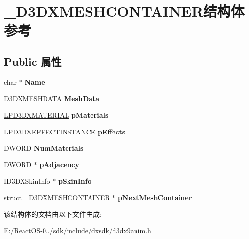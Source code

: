 \hypertarget{struct___d3_d_x_m_e_s_h_c_o_n_t_a_i_n_e_r}{}\section{\+\_\+\+D3\+D\+X\+M\+E\+S\+H\+C\+O\+N\+T\+A\+I\+N\+E\+R结构体 参考}
\label{struct___d3_d_x_m_e_s_h_c_o_n_t_a_i_n_e_r}
\subsection*{Public 属性}
\begin{DoxyCompactItemize}
\item 
\mbox{\label{struct___d3_d_x_m_e_s_h_c_o_n_t_a_i_n_e_r_adaf17b161d78cec5b23e88fd559e7b4f}} 
char $\ast$ {\bfseries Name}
\item 
\mbox{\label{struct___d3_d_x_m_e_s_h_c_o_n_t_a_i_n_e_r_a476873e422f689ecfd5326aa98139ac7}} 
\hyperlink{struct___d3_d_x_m_e_s_h_d_a_t_a}{D3\+D\+X\+M\+E\+S\+H\+D\+A\+TA} {\bfseries Mesh\+Data}
\item 
\mbox{\label{struct___d3_d_x_m_e_s_h_c_o_n_t_a_i_n_e_r_a9a65238dc309558441abc88de624f661}} 
\hyperlink{struct___d3_d_x_m_a_t_e_r_i_a_l}{L\+P\+D3\+D\+X\+M\+A\+T\+E\+R\+I\+AL} {\bfseries p\+Materials}
\item 
\mbox{\label{struct___d3_d_x_m_e_s_h_c_o_n_t_a_i_n_e_r_a033154ae07d5b0475d111dedd26c5afb}} 
\hyperlink{struct___d3_d_x_e_f_f_e_c_t_i_n_s_t_a_n_c_e}{L\+P\+D3\+D\+X\+E\+F\+F\+E\+C\+T\+I\+N\+S\+T\+A\+N\+CE} {\bfseries p\+Effects}
\item 
\mbox{\label{struct___d3_d_x_m_e_s_h_c_o_n_t_a_i_n_e_r_aa9eaaeed481a057cbb3569ab0b389f2b}} 
D\+W\+O\+RD {\bfseries Num\+Materials}
\item 
\mbox{\label{struct___d3_d_x_m_e_s_h_c_o_n_t_a_i_n_e_r_aba5026c5908f7fac0d444a0d171b491f}} 
D\+W\+O\+RD $\ast$ {\bfseries p\+Adjacency}
\item 
\mbox{\label{struct___d3_d_x_m_e_s_h_c_o_n_t_a_i_n_e_r_afd6f76934feccd37269e362e255532bb}} 
I\+D3\+D\+X\+Skin\+Info $\ast$ {\bfseries p\+Skin\+Info}
\item 
\mbox{\label{struct___d3_d_x_m_e_s_h_c_o_n_t_a_i_n_e_r_aa303163ef838ca8738eb0f2ead6ef03c}} 
\hyperlink{interfacestruct}{struct} \hyperlink{struct___d3_d_x_m_e_s_h_c_o_n_t_a_i_n_e_r}{\+\_\+\+D3\+D\+X\+M\+E\+S\+H\+C\+O\+N\+T\+A\+I\+N\+ER} $\ast$ {\bfseries p\+Next\+Mesh\+Container}
\end{DoxyCompactItemize}


该结构体的文档由以下文件生成\+:\begin{DoxyCompactItemize}
\item 
E\+:/\+React\+O\+S-\/0../sdk/include/dxsdk/d3dx9anim.\+h\end{DoxyCompactItemize}
